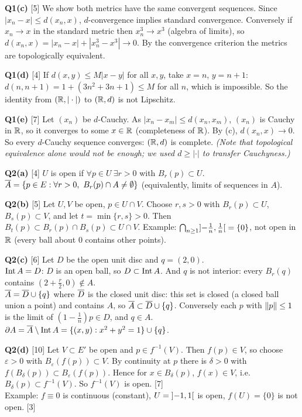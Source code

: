 \textbf{Q1(c)} [5] We show both metrics have the same convergent sequences. Since
$|x_n-x|\le d(x_n,x)$, $d$-convergence implies standard convergence. Conversely if $x_n\to x$ in
the standard metric then $x_n^3\to x^3$ (algebra of limits), so
$d(x_n,x)=|x_n-x|+|x_n^3-x^3|\to0$. By the convergence criterion the metrics are topologically
equivalent.

\textbf{Q1(d)} [4] If $d(x,y)\le M|x-y|$ for all $x,y$, take $x=n$, $y=n+1$:
$d(n,n+1)=1+(3n^2+3n+1)\le M$ for all $n$, which is impossible. So the identity from
$(\mathbb R,|\cdot|)$ to $(\mathbb R,d)$ is not Lipschitz.

\textbf{Q1(e)} [7] Let $(x_n)$ be $d$-Cauchy. As $|x_n-x_m|\le d(x_n,x_m)$, $(x_n)$ is Cauchy
in $\mathbb R$, so it converges to some $x\in\mathbb R$ (completeness of $\mathbb R$). By (c), $d(x_n,x)\to0$. So
every $d$-Cauchy sequence converges: $(\mathbb R,d)$ is complete. \emph{(Note that topological
equivalence alone would not be enough; we used $d\ge|\cdot|$ to transfer Cauchyness.)}

\textbf{Q2(a)} [4] $U$ is open if $\forall p\in U\ \exists r>0$ with $B_r(p)\subset U$.
$\overline{A}=\{p\in E:\forall r>0,\ B_r(p)\cap A\ne\emptyset\}$ (equivalently, limits of sequences in
$A$).

\textbf{Q2(b)} [5] Let $U,V$ be open, $p\in U\cap V$. Choose $r,s>0$ with $B_r(p)\subset U$,
$B_s(p)\subset V$, and let $t=\min\{r,s\}>0$. Then $B_t(p)\subset B_r(p)\cap B_s(p)\subset U\cap V$.
Example: $\bigcap_{n\ge1}\mathopen{]}-\frac1n,\frac1n\mathclose{[}=\{0\}$, not open in $\mathbb R$ (every ball about $0$
contains other points).

\textbf{Q2(c)} [6] Let $D$ be the open unit disc and $q=(2,0)$.\\
$\operatorname{Int} A=D$: $D$ is an open ball, so $D\subset\operatorname{Int} A$. And $q$ is not interior: every
$B_r(q)$ contains $(2+\frac r2,0)\notin A$.\\
$\overline{A}=\overline{D}\cup\{q\}$ where $\overline{D}$ is the closed unit disc: this set is closed (a closed ball
union a point) and contains $A$, so $\overline{A}\subset\overline{D}\cup\{q\}$. Conversely each $p$ with
$\left\lVert p\right\rVert\le1$ is the limit of $(1-\frac1n)p\in D$, and $q\in A$.\\
$\partial A=\overline{A}\setminus\operatorname{Int} A=\{(x,y):x^2+y^2=1\}\cup\{q\}$.

\textbf{Q2(d)} [10] Let $V\subset E'$ be open and $p\in f^{-1}(V)$. Then $f(p)\in V$, so
choose $\varepsilon>0$ with $B_\varepsilon(f(p))\subset V$. By continuity at $p$ there is
$\delta>0$ with $f(B_\delta(p))\subset B_\varepsilon(f(p))$. Hence for $x\in B_\delta(p)$,
$f(x)\in V$, i.e.\ $B_\delta(p)\subset f^{-1}(V)$. So $f^{-1}(V)$ is open. [7]\\
Example: $f\equiv0$ is continuous (constant), $U=\mathopen{]}-1,1\mathclose{[}$ is open, $f(U)=\{0\}$ is not open. [3]

